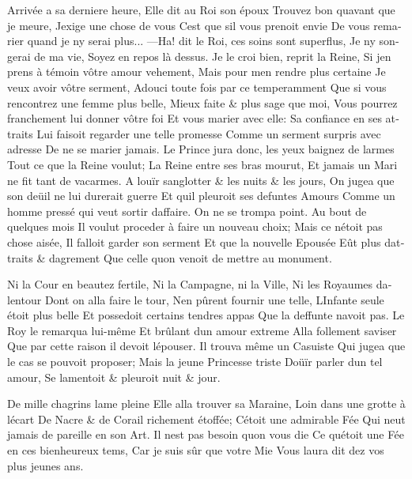 \documentclass[14pt,a4paper]{memoir}
\begin{document}
\begin{otherlanguage}{french}
{Arrivée a sa derniere heure,} {Elle dit au Roi son époux} {Trouvez bon
qu\textquotesingle avant que je meure,} {J\textquotesingle exige une
chose de vous} {C\textquotesingle est que s\textquotesingle il vous
prenoit envie} {De vous remarier quand je n\textquotesingle y serai
plus...} {---Ha! dit le Roi, ces soins sont superflus, } {Je
n\textquotesingle y songerai de ma vie,} {Soyez en repos là dessus.} {Je
le croi bien, reprit la Reine,} {Si j\textquotesingle en prens à témoin
vôtre amour vehement,} {Mais pour m\textquotesingle en rendre plus
certaine} {Je veux avoir vôtre serment,} {Adouci toute fois par ce
temperamment} {Que si vous rencontrez une femme plus belle,} {Mieux
faite \& plus sage que moi,} {Vous pourrez franchement lui donner vôtre
foi} {Et vous marier avec elle:} {Sa confiance en ses attraits} {Lui
faisoit regarder une telle promesse} {Comme un serment surpris avec
adresse} {De ne se marier jamais.} {Le Prince jura donc, les yeux
baignez de larmes } {Tout ce que la Reine voulut;} {La Reine entre ses
bras mourut,} {Et jamais un Mari ne fit tant de vacarmes.} {A
l\textquotesingle ouïr sanglotter \& les nuits \& les jours,} {On jugea
que son deüil ne lui durerait guerre} {Et qu\textquotesingle il pleuroit
ses defuntes Amours} {Comme un homme pressé qui veut sortir
d\textquotesingle affaire. } {On ne se trompa point. Au bout de quelques
mois } {Il voulut proceder à faire un nouveau choix;} {Mais ce
n\textquotesingle étoit pas chose aisée,} {Il falloit garder son
serment} {Et que la nouvelle Epousée} {Eût plus
d\textquotesingle attraits \& d\textquotesingle agrement} {Que celle
qu\textquotesingle on venoit de mettre au monument.}

{Ni la Cour en beautez fertile,} {Ni la Campagne, ni la Ville,} {Ni les
Royaumes d\textquotesingle alentour} {Dont on alla faire le tour,}
{N\textquotesingle en pûrent fournir une telle,}
{L\textquotesingle Infante seule étoit plus belle} {Et possedoit
certains tendres appas} {Que la deffunte n\textquotesingle avoit pas.}
{Le Roy le remarqua lui-même} {Et brûlant d\textquotesingle un amour
extreme} {Alla follement s\textquotesingle aviser} {Que par cette raison
il devoit l\textquotesingle épouser.} {Il trouva même un Casuiste} {Qui
jugea que le cas se pouvoit proposer;} {Mais la jeune Princesse triste}
{D\textquotesingle oüïr parler d\textquotesingle un tel amour,} {Se
lamentoit \& pleuroit nuit \& jour.}

{De mille chagrins l\textquotesingle ame pleine} {Elle alla trouver sa
Maraine,} {Loin dans une grotte à l\textquotesingle écart} {De Nacre \&
de Corail richement étoffée;} {C\textquotesingle étoit une admirable
Fée} {Qui n\textquotesingle eut jamais de pareille en son Art.} {Il
n\textquotesingle est pas besoin qu\textquotesingle on vous die} {Ce
qu\textquotesingle étoit une Fée en ces bienheureux tems,} {Car je suis
sûr que votre Mie} {Vous l\textquotesingle aura dit dez vos plus jeunes
ans.}


\end{otherlanguage}
\end{document}
